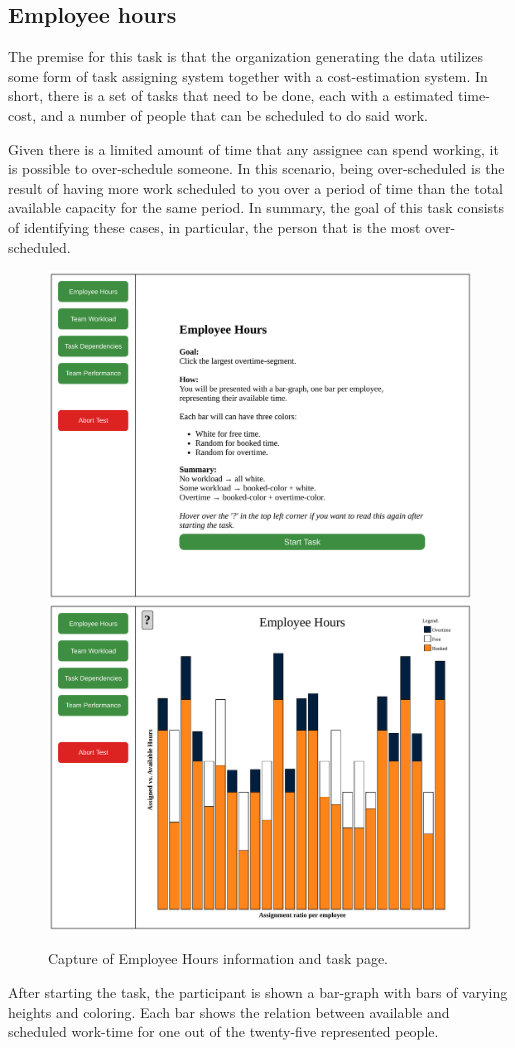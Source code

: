 {  \subsection{Employee hours}

    \textit{\ideaOne}

    The premise for this task is that the organization generating the data
    utilizes some form of task assigning system together with a
    cost-estimation system. In short, there is a set of tasks that need to
    be done, each with a estimated time-cost, and a number of people that
    can be scheduled to do said work.

    Given there is a limited amount of time that any assignee can spend
    working, it is possible to over-schedule someone. In this scenario,
    being over-scheduled is the result of having more work scheduled to you
    over a period of time than the total available capacity for the same
    period. In summary, the goal of this task consists of identifying these
    cases, in particular, the person that is the most over-scheduled.

    \begin{figure}[h!]
      \centering
      \includegraphics[width=.49\textwidth]{figures/captures/webapp_employee_hours_info.pdf}
      \includegraphics[width=.49\textwidth]{figures/captures/webapp_employee_hours_task.pdf}
      \caption{Capture of Employee Hours information and task page.}
    \end{figure}

    After starting the task, the participant is shown a bar-graph with bars
    of varying heights and coloring. Each bar shows the relation between
    available and scheduled work-time for one out of the twenty-five
    represented people.

}
